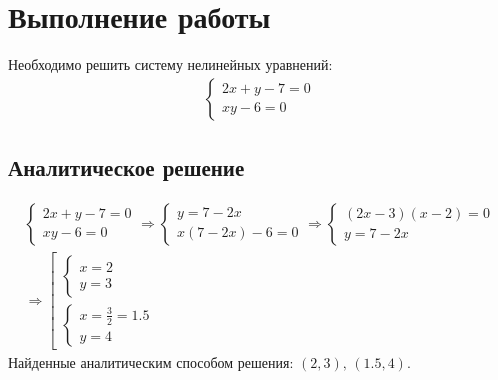 \section{Выполнение работы}

Необходимо решить систему нелинейных уравнений:
\begin{align}
	\begin{cases}
		2x + y - 7 = 0 \\
		xy - 6 = 0
	\end{cases}
\end{align}

\subsection{Аналитическое решение}
\begin{align}
	\begin{cases}
		2x + y - 7 = 0 \\
		xy - 6 = 0
	\end{cases} \Longrightarrow
	\begin{cases}
		y = 7 - 2x \\
		x(7 - 2x) - 6 = 0
	\end{cases} \Longrightarrow
	\begin{cases}
		(2x - 3)(x - 2) = 0 \\
		y = 7 - 2x
	\end{cases} \\
	\Longrightarrow
	\left[
	\begin{array}{ll}
		\begin{cases}
			x = 2 \\
			y = 3
		\end{cases} \\
		\begin{cases}
			x = \frac{3}{2} = 1.5 \\
			y = 4
		\end{cases}
	\end{array}
	\right.
\end{align}
Найденные аналитическим способом решения: \((2, 3),\, (1.5, 4)\).
